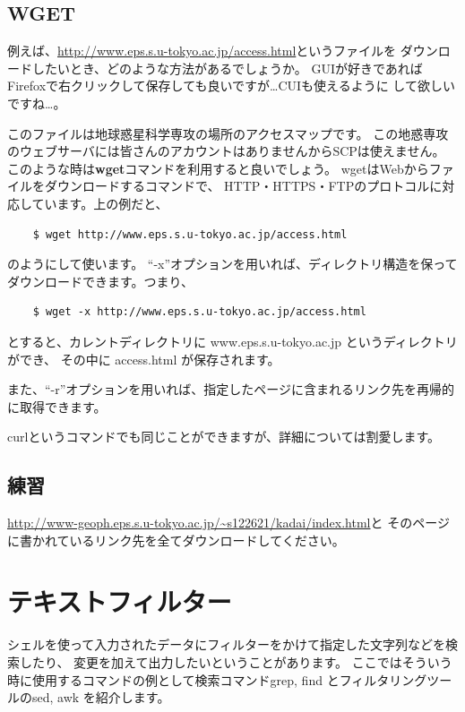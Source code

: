 \documentclass[a4j]{ltjreport}
\begin{document}
    \subsection{WGET}
    例えば、\url{http://www.eps.s.u-tokyo.ac.jp/access.html}というファイルを
    ダウンロードしたいとき、どのような方法があるでしょうか。
    GUIが好きであればFirefoxで右クリックして保存しても良いですが…CUIも使えるように
    して欲しいですね…。

    このファイルは地球惑星科学専攻の場所のアクセスマップです。
    この地惑専攻のウェブサーバには皆さんのアカウントはありませんからSCPは使えません。
    このような時は\textbf{wget}コマンドを利用すると良いでしょう。
    wgetはWebからファイルをダウンロードするコマンドで、
    HTTP・HTTPS・FTPのプロトコルに対応しています。上の例だと、
    \begin{verbatim}
    $ wget http://www.eps.s.u-tokyo.ac.jp/access.html
    \end{verbatim}
    のようにして使います。
    “-x”オプションを用いれば、ディレクトリ構造を保ってダウンロードできます。つまり、
    \begin{verbatim}
    $ wget -x http://www.eps.s.u-tokyo.ac.jp/access.html
    \end{verbatim}
    とすると、カレントディレクトリに www.eps.s.u-tokyo.ac.jp というディレクトリができ、
    その中に access.html が保存されます。

    また、“-r”オプションを用いれば、指定したページに含まれるリンク先を再帰的に取得できます。

    curlというコマンドでも同じことができますが、詳細については割愛します。

    \vspace{1em}

    \subsection{練習}
    \url{http://www-geoph.eps.s.u-tokyo.ac.jp/~s122621/kadai/index.html}と
    そのページに書かれているリンク先を全てダウンロードしてください。

    \section{テキストフィルター}
    シェルを使って入力されたデータにフィルターをかけて指定した文字列などを検索したり、
    変更を加えて出力したいということがあります。
    ここではそういう時に使用するコマンドの例として検索コマンドgrep, find
    とフィルタリングツールのsed, awk を紹介します。
\end{document}

